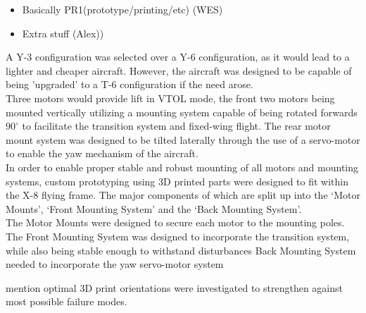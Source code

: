 \color{red}
\begin{itemize}
\item Basically PR1(prototype/printing/etc) (WES)
\item Extra stuff (Alex))
\end{itemize}
\color{black}

A Y-3 configuration was selected over a Y-6 configuration, as it would lead to a lighter and cheaper aircraft. However, the aircraft was designed to be capable of being 'upgraded' to a T-6 configuration if the need arose.\\
Three motors would provide lift in VTOL mode, the front two motors being mounted vertically utilizing a mounting system capable of being rotated forwards $90^{\circ}$ to facilitate the transition system and fixed-wing flight. The rear motor mount system was designed to be tilted laterally through the use of a servo-motor to enable the yaw mechanism of the aircraft.\\
In order to enable proper stable and robust mounting of all motors and mounting systems, custom prototyping using 3D printed parts were designed to fit within the X-8 flying frame. The major components of which are split up into the `Motor Mounts', `Front  Mounting System' and the `Back Mounting System'.\\
The Motor Mounts were designed to secure each motor to the mounting poles. 
The Front Mounting System was designed to incorporate the transition system, while also being stable enough to withstand disturbances
Back Mounting System needed to incorporate the yaw servo-motor system

mention optimal 3D print orientations were investigated to strengthen against most possible failure modes.
